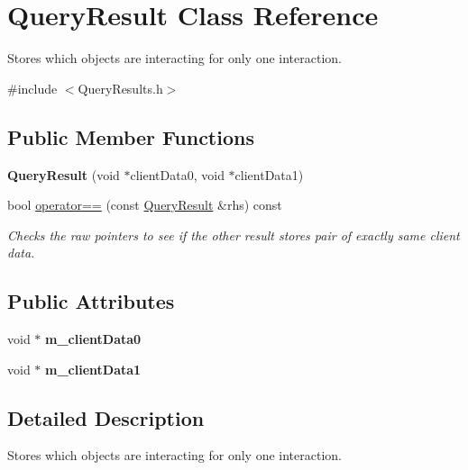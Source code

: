 \hypertarget{classQueryResult}{}\section{Query\+Result Class Reference}
\label{classQueryResult}


Stores which objects are interacting for only one interaction.  




{\ttfamily \#include $<$Query\+Results.\+h$>$}

\subsection*{Public Member Functions}
\begin{DoxyCompactItemize}
\item 
\mbox{\label{classQueryResult_a8a8e372f20aede57dd8ea5f6d8c7e21b}} 
{\bfseries Query\+Result} (void $\ast$client\+Data0, void $\ast$client\+Data1)
\item 
bool \hyperlink{classQueryResult_ae0b1f5779416deb42a3e479e410813ea}{operator==} (const \hyperlink{classQueryResult}{Query\+Result} \&rhs) const
\begin{DoxyCompactList}\small\item\em Checks the raw pointers to see if the other result stores pair of exactly same client data. \end{DoxyCompactList}\end{DoxyCompactItemize}
\subsection*{Public Attributes}
\begin{DoxyCompactItemize}
\item 
\mbox{\label{classQueryResult_abb436a572b68e508716e3718459c06dc}} 
void $\ast$ {\bfseries m\+\_\+client\+Data0}
\item 
\mbox{\label{classQueryResult_a172c2a316ecf890b390c27af9c8438ad}} 
void $\ast$ {\bfseries m\+\_\+client\+Data1}
\end{DoxyCompactItemize}


\subsection{Detailed Description}
Stores which objects are interacting for only one interaction. 

